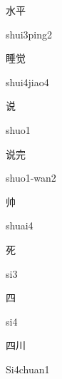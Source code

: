 \begin{multicols*}{2}
\begin{verbete}{水平}
\begin{pronuncia}{shui3ping2}
\end{pronuncia}
\end{verbete}

\begin{verbete}{睡觉}
\begin{pronuncia}{shui4jiao4}
\end{pronuncia}
\end{verbete}

\begin{verbete}[shuo1]{说}
\begin{pronuncia}{shuo1}
\end{pronuncia}
\end{verbete}

\begin{verbete}{说完}
\begin{pronuncia}{shuo1-wan2}
\end{pronuncia}
\end{verbete}

\begin{verbete}[shuai4]{帅}
\begin{pronuncia}{shuai4}
\end{pronuncia}
\end{verbete}

\begin{verbete}[si3]{死}
\begin{pronuncia}{si3}
\end{pronuncia}
\end{verbete}

\begin{verbete}[si4]{四}
\begin{pronuncia}{si4}
\end{pronuncia}
\end{verbete}

\begin{verbete}[Si4chuan1]{四川}
\begin{pronuncia}{Si4chuan1}
\end{pronuncia}
\end{verbete}


\end{multicols*}
